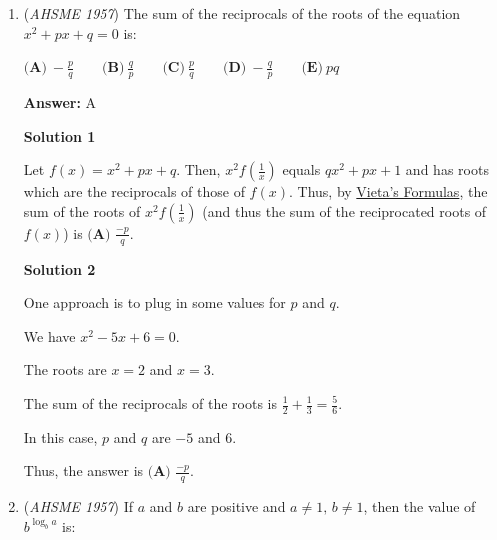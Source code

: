 \begin{enumerate}
 Regarding the sufficiency of this condition, because the centroid is $\frac2 3$ of the way along each of the medians of the triangle, the three smaller triangles, with the same base and a third of the height of the large triangle, have one third of the area of the larger triangle. Thus, they all have equal areas, so it is sufficient that point $P$ is the centroid.

 Thus, our answer is $\fbox{\textbf{(E) }the intersection of the medians of the triangle}$.

 To disprove the other answers, try to draw counterexamples in extreme cases (so that it is obvious that a specific answer choice is incorrect).

 


	\item (\textit{AHSME 1957}) The sum of the reciprocals of the roots of the equation $x^2 + px + q = 0$ is: 


 $\textbf{(A)}\ -\frac{p}{q} \qquad \textbf{(B)}\ \frac{q}{p}\qquad \textbf{(C)}\ \frac{p}{q}\qquad \textbf{(D)}\ -\frac{q}{p}\qquad\textbf{(E)}\ pq$

 \textbf{Answer: }A



\textbf{Solution 1}

Let $f(x)=x^2+px+q$. Then, $x^2f(\frac1 x)$ equals $qx^2+px+1$ and has roots which are the reciprocals of those of $f(x)$. Thus, by \href{https://artofproblemsolving.com/wiki/index.php?title=Vieta\%27s\_Formulas}{Vieta's Formulas}, the sum of the roots of $x^2f(\frac1 x)$ (and thus the sum of the reciprocated roots of $f(x)$) is $\boxed{\textbf{(A) }\frac{-p}{q}}$.

 



\textbf{Solution 2}

One approach is to plug in some values for $p$ and $q$.

 We have $x^2-5x+6=0$.

 The roots are $x=2$ and $x=3$.

 The sum of the reciprocals of the roots is $\frac{1}{2}+\frac{1}{3}=\frac{5}{6}$.

 In this case, $p$ and $q$ are $-5$ and $6$.

 Thus, the answer is $\boxed{\textbf{(A) }\frac{-p}q}$.

 


	\item (\textit{AHSME 1957}) If $a$ and $b$ are positive and $a\not= 1,\,b\not= 1$, then the value of $b^{\log_b{a}}$ is: 



\end{enumerate}
